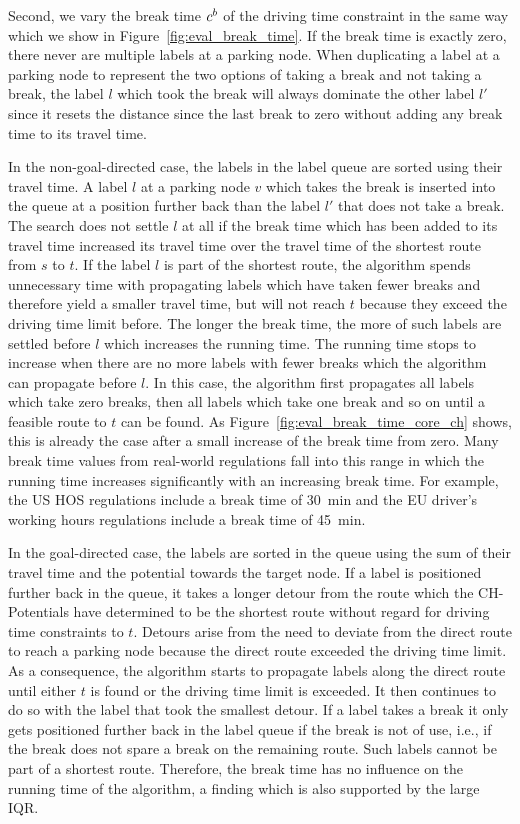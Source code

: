 Second, we vary the break time $c^b$ of the driving time constraint in the same way which we show in Figure~\ref{fig:eval_break_time}. If the break time is exactly zero, there never are multiple labels at a parking node. When duplicating a label at a parking node to represent the two options of taking a break and not taking a break, the label $l$ which took the break will always dominate the other label $l'$ since it resets the distance since the last break to zero without adding any break time to its travel time.

In the non-goal-directed case, the labels in the label queue are sorted using their travel time. A label $l$ at a parking node $v$ which takes the break is inserted into the queue at a position further back than the label $l'$ that does not take a break. The search does not settle $l$ at all if the break time which has been added to its travel time increased its travel time over the travel time of the shortest route from $s$ to $t$. If the label $l$ is part of the shortest route, the algorithm spends unnecessary time with propagating labels which have taken fewer breaks and therefore yield a smaller travel time, but will not reach $t$ because they exceed the driving time limit before. The longer the break time, the more of such labels are settled before $l$ which increases the running time. The running time stops to increase when there are no more labels with fewer breaks which the algorithm can propagate before $l$. In this case, the algorithm first propagates all labels which take zero breaks, then all labels which take one break and so on until a feasible route to $t$ can be found. As Figure~\ref{fig:eval_break_time_core_ch} shows, this is already the case after a small increase of the break time from zero. Many break time values from real-world regulations fall into this range in which the running time increases significantly with an increasing break time. For example, the US HOS regulations include a break time of \SI{30}{\minute} and the EU driver's working hours regulations include a break time of \SI{45}{\minute}.

In the goal-directed case, the labels are sorted in the queue using the sum of their travel time and the potential towards the target node. If a label is positioned further back in the queue, it takes a longer detour from the route which the CH-Potentials have determined to be the shortest route without regard for driving time constraints to $t$. Detours arise from the need to deviate from the direct route to reach a parking node because the direct route exceeded the driving time limit. As a consequence, the algorithm starts to propagate labels along the direct route until either $t$ is found or the driving time limit is exceeded. It then continues to do so with the label that took the smallest detour. If a label takes a break it only gets positioned further back in the label queue if the break is not of use, i.e., if the break does not spare a break on the remaining route. Such labels cannot be part of a shortest route. Therefore, the break time has no influence on the running time of the algorithm, a finding which is also supported by the large IQR.

